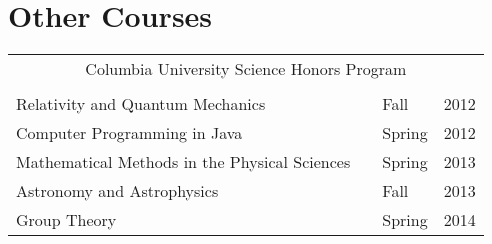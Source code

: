 \documentclass[10pt,letterpaper,sans]{moderncv}
\begin{document}
\section{Other Courses}
\setlength{\tabcolsep}{10pt}
\begin{tabular}{l p{0.6in} l l}
  \\
  \multicolumn{4}{c}{Columbia University Science Honors Program} \\
  \\
  Relativity and Quantum Mechanics              & \hfill & Fall   & 2012 \\
  Computer Programming in Java                  & \hfill & Spring & 2012 \\
  Mathematical Methods in the Physical Sciences & \hfill & Spring & 2013 \\
  Astronomy and Astrophysics                    & \hfill & Fall   & 2013 \\
  Group Theory                                  & \hfill & Spring & 2014 \\
\end{tabular}
\end{document}
